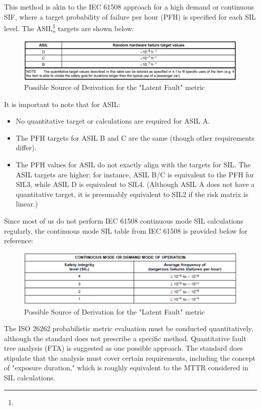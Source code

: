 \documentclass[./dissertation.tex]{subfiles}
\begin{document}
This method is akin to the IEC 61508 approach for a high demand or continuous SIF, where a target probability of failure per hour (PFH) is specified for each SIL level. The ASIL\footnote{} targets are shown below:

\begin{figure}[H]
\centering
\includegraphics[width=\linewidth]{subfiles/imgs/asil-t-6.png}
\caption{Possible Source of Derivation for the "Latent Fault" metric}
\label{fig:asil-t-6}
\end{figure}

It is important to note that for ASIL:

\begin{itemize}
\item No quantitative target or calculations are required for ASIL A.
\item The PFH targets for ASIL B and C are the same (though other requirements differ).
\item The PFH values for ASIL do not exactly align with the targets for SIL. The ASIL targets are higher; for instance, ASIL B/C is equivalent to the PFH for SIL3, while ASIL D is equivalent to SIL4. (Although ASIL A does not have a quantitative target, it is presumably equivalent to SIL2 if the risk matrix is linear.)
\end{itemize}

Since most of us do not perform IEC 61508 continuous mode SIL calculations regularly, the continuous mode SIL table from IEC 61508 is provided below for reference:

\begin{figure}[H]
\centering
\includegraphics[width=\linewidth]{subfiles/imgs/random-asil.png}
\caption{Possible Source of Derivation for the "Latent Fault" metric}
\label{fig:random-asil}
\end{figure}

The ISO 26262 probabilistic metric evaluation must be conducted quantitatively, although the standard does not prescribe a specific method. Quantitative fault tree analysis (FTA) is suggested as one possible approach. The standard does stipulate that the analysis must cover certain requirements, including the concept of "exposure duration," which is roughly equivalent to the MTTR considered in SIL calculations.
\end{document}

